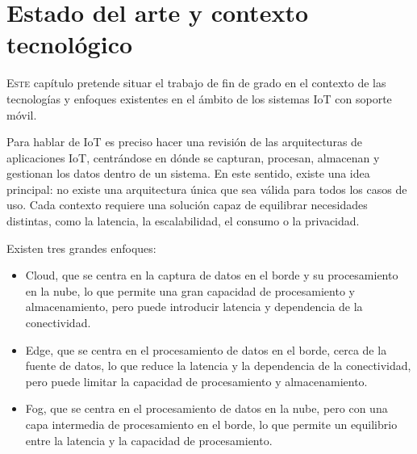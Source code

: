\chapter{Estado del arte y contexto tecnológico}
\label{chap:estado-arte}

\lettrine{E}{ste} capítulo pretende situar el trabajo de fin de grado en el contexto de las tecnologías y enfoques existentes en el ámbito de los sistemas IoT con soporte móvil.


Para hablar de IoT es preciso hacer una revisión de las arquitecturas de aplicaciones IoT, centrándose en dónde se capturan, procesan, almacenan y gestionan los datos dentro de un sistema. En este sentido, existe una idea principal: no existe una arquitectura única que sea válida para todos los casos de uso. Cada contexto requiere una solución capaz de equilibrar necesidades distintas, como la latencia, la escalabilidad, el consumo o la privacidad.

Existen tres grandes enfoques:
\begin{itemize}
  \item Cloud, que se centra en la captura de datos en el borde y su procesamiento en la nube, lo que permite una gran capacidad de procesamiento y almacenamiento, pero puede introducir latencia y dependencia de la conectividad.
  \item Edge, que se centra en el procesamiento de datos en el borde, cerca de la fuente de datos, lo que reduce la latencia y la dependencia de la conectividad, pero puede limitar la capacidad de procesamiento y almacenamiento.
  \item Fog, que se centra en el procesamiento de datos en la nube, pero con una capa intermedia de procesamiento en el borde, lo que permite un equilibrio entre la latencia y la capacidad de procesamiento.
\end{itemize}

